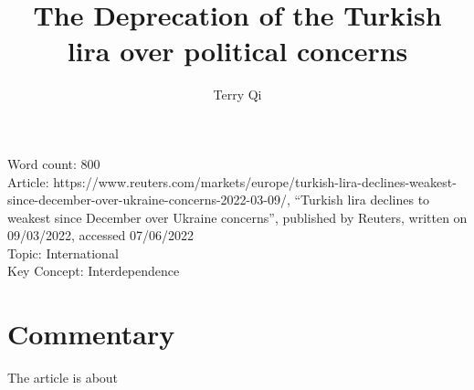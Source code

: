 \documentclass[a4paper,12pt]{article}
\title{The Deprecation of the Turkish lira over political concerns}
\author{Terry Qi}
\begin{document}
\maketitle
Word count: 800\\
Article: https://www.reuters.com/markets/europe/turkish-lira-declines-weakest-since-december-over-ukraine-concerns-2022-03-09/, ``Turkish lira declines to weakest since December over Ukraine concerns'', published by Reuters, written on 09/03/2022, accessed 07/06/2022\\
Topic: International\\
Key Concept: Interdependence

\newpage
\section*{Commentary}

The article is about
\end{document}
